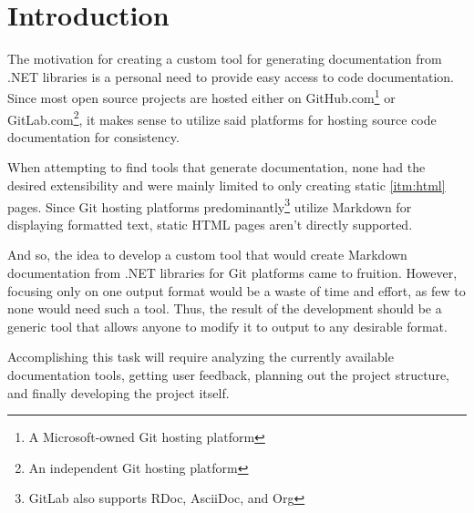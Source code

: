 \chapter*{Introduction}

The motivation for creating a custom tool for generating documentation from .NET libraries is a personal need to provide easy access to code documentation. Since most open source projects are hosted either on GitHub.com\footnote{A Microsoft-owned Git hosting platform} or GitLab.com\footnote{An independent Git hosting platform}, it makes sense to utilize said platforms for hosting source code documentation for consistency.

When attempting to find tools that generate documentation, none had the desired extensibility and were mainly limited to only creating static \ref{itm:html} pages. Since Git hosting platforms predominantly\footnote{GitLab also supports RDoc, AsciiDoc, and Org} utilize Markdown for displaying formatted text, static HTML pages aren't directly supported.

And so, the idea to develop a custom tool that would create Markdown documentation from .NET libraries for Git platforms came to fruition. However, focusing only on one output format would be a waste of time and effort, as few to none would need such a tool. Thus, the result of the development should be a generic tool that allows anyone to modify it to output to any desirable format.

Accomplishing this task will require analyzing the currently available documentation tools, getting user feedback, planning out the project structure, and finally developing the project itself.
